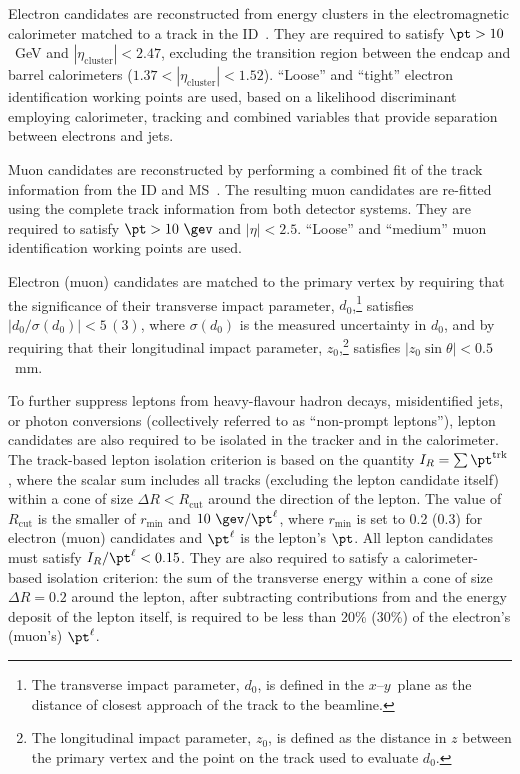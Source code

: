 \documentclass[cernpreprint, atlasdraft=false, texlive=2023, UKenglish, texmf, orcidlogo]{atlasdoc}
\begin{document}
Electron candidates are reconstructed from energy clusters in the electromagnetic calorimeter matched to a track in the ID~\cite{EGAM-2018-01}. They are required to satisfy $\pt>10$~GeV and $|\eta_{\mathrm{cluster}}|<2.47$, excluding the transition region between the endcap and barrel calorimeters ($1.37<|\eta_{\mathrm{cluster}}|<1.52$).
\enquote{Loose} and \enquote{tight} electron identification working points are used, based on a likelihood discriminant employing calorimeter, tracking and combined variables that provide separation between electrons and jets.
 
Muon candidates are reconstructed by performing a combined fit of the track information from the ID and MS~\cite{MUON-2018-03}. The resulting muon candidates are re-fitted using the complete track information from both detector systems. They are required to satisfy $\pt > 10~\gev$ and $|\eta| < 2.5$. \enquote{Loose} and \enquote{medium} muon identification working points are used.
 
Electron (muon) candidates are matched to the primary vertex by
requiring that the significance of their transverse impact parameter,
$d_0$,\footnote{The transverse impact parameter, $d_0$, is
defined in the $x$--$y$~plane as the distance of closest approach of the
track to the beamline.} satisfies $|d_0/\sigma(d_0)|<5\,(3)$, where
$\sigma(d_0)$ is the measured uncertainty in $d_0$, and by requiring
that their longitudinal impact parameter, $z_0$,\footnote{The longitudinal impact parameter, $z_0$, is defined as the distance in $z$ between the primary vertex and the point on the track used to evaluate $d_0$.}
satisfies
$|z_0 \sin\theta|<0.5$~mm.
 
To further suppress leptons from heavy-flavour hadron decays, misidentified jets, or photon conversions (collectively referred to as \enquote{non-prompt leptons}), lepton candidates are also required to be isolated in the tracker and in the calorimeter. The track-based lepton isolation criterion is based on the quantity $I_R = \sum \pt^{\textrm{trk}}$, where the scalar sum includes all tracks (excluding the lepton candidate itself) within a cone of size $\Delta R<R_{\textrm{cut}}$ around the direction of the lepton.  The value of $R_{\textrm{cut}}$ is the smaller of $r_{\textrm{min}}$ and $10~\gev/\pt^\ell$, where $r_{\textrm{min}}$ is set to 0.2 (0.3) for electron (muon) candidates and $\pt^\ell$ is the lepton's $\pt$. All lepton candidates must satisfy $I_R/\pt^\ell < 0.15$.
They are also required to satisfy a calorimeter-based isolation criterion: the sum of the transverse energy within a cone of size $\Delta R=0.2$ around the lepton, after subtracting contributions from \pileup and the energy deposit of the lepton itself, is required to be less than 20\% (30\%) of the electron's (muon's) $\pt^\ell$.
 
\end{document}
